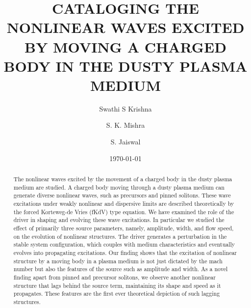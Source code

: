 \documentclass[%
 aip,
 amsmath,amssymb,
 reprint,%
]{revtex4-1}
\begin{document}

\title{CATALOGING THE NONLINEAR WAVES EXCITED BY MOVING A CHARGED BODY IN THE DUSTY PLASMA MEDIUM}
\author{Swathi S Krishna}
%


\author{S. K. Mishra}
 
%

\date{\today}%
\author{S. Jaiswal}%
%

\begin{abstract}
The nonlinear waves excited by the movement of a charged body in the dusty plasma medium are studied. A charged body moving through a dusty plasma medium can generate diverse nonlinear waves, such as precursors and pinned solitons. These wave excitations under weakly nonlinear and dispersive limits are described theoretically by the forced Korteweg-de Vries (fKdV) type equation. We have examined the role of the driver in shaping and evolving these wave excitations. In particular we studied the effect of primarily three source parameters, namely, amplitude, width, and flow speed, on the evolution of nonlinear structures.
The driver generates a perturbation in the stable system configuration, which couples with medium characteristics and eventually evolves into propagating excitations. Our finding shows that the excitation of nonlinear structure by a moving body in a plasma medium is not just dictated by the mach number but also the features of the source such as amplitude and width. As a novel finding apart from pinned and precursor solitons, we observe another nonlinear structure that lags behind the source term, maintaining its shape and speed as it propagates. These features are the first ever theoretical depiction of such lagging structures.

\end{abstract}
\end{document}
